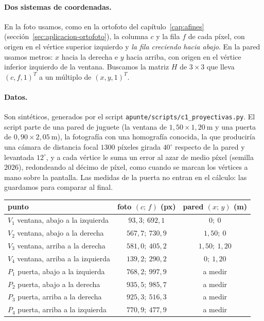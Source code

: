 \paragraph{Dos sistemas de coordenadas.} En la foto usamos, como en la ortofoto del
capítulo~\ref{cap:afines} (sección~\ref{sec:aplicacion-ortofoto}), la columna \(c\) y la fila
\(f\) de cada píxel, con origen en el vértice superior izquierdo y \emph{la fila creciendo hacia
abajo}. En la pared usamos metros: \(x\) hacia la derecha e \(y\) hacia arriba, con origen en el
vértice inferior izquierdo de la ventana. Buscamos la matriz \(H\) de \(3\times3\) que lleva
\((c,f,1)^T\) a un múltiplo de \((x,y,1)^T\).

\paragraph{Datos.} Son sintéticos, generados por el script
\texttt{apunte/scripts/c1\_proyectivas.py}. El script parte de una pared de juguete (la ventana de
\(1{,}50\times1{,}20\ \mathrm{m}\) y una puerta de \(0{,}90\times2{,}05\ \mathrm{m}\)), la
fotografía con una homografía conocida, la que produciría una cámara de distancia focal
\(1300\) píxeles girada \(40^\circ\) respecto de la pared y levantada \(12^\circ\), y a cada
vértice le suma un error al azar de medio píxel (semilla \(2026\)), redondeando al décimo de
píxel, como cuando se marcan los vértices a mano sobre la pantalla. Las medidas de la puerta no
entran en el cálculo: las guardamos para comparar al final.
\begin{center}
\begin{tabular}{lcc}
\toprule
punto & foto \((c;\,f)\) (px) & pared \((x;\,y)\) (m)\\
\midrule
\(V_1\) ventana, abajo a la izquierda & \(93{,}3;\ 692{,}1\) & \(0;\ 0\)\\
\(V_2\) ventana, abajo a la derecha & \(567{,}7;\ 730{,}9\) & \(1{,}50;\ 0\)\\
\(V_3\) ventana, arriba a la derecha & \(581{,}0;\ 405{,}2\) & \(1{,}50;\ 1{,}20\)\\
\(V_4\) ventana, arriba a la izquierda & \(139{,}2;\ 290{,}2\) & \(0;\ 1{,}20\)\\
\midrule
\(P_1\) puerta, abajo a la izquierda & \(768{,}2;\ 997{,}9\) & a medir\\
\(P_2\) puerta, abajo a la derecha & \(935{,}5;\ 985{,}7\) & a medir\\
\(P_3\) puerta, arriba a la derecha & \(925{,}3;\ 516{,}3\) & a medir\\
\(P_4\) puerta, arriba a la izquierda & \(770{,}9;\ 477{,}9\) & a medir\\
\bottomrule
\end{tabular}
\end{center}

